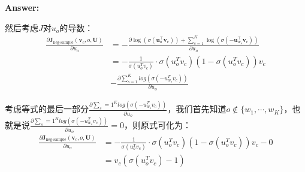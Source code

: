 \documentclass{article}
\newenvironment{answer}{
    {\bf Answer:} \sf \begingroup\color{red}
}{\endgroup}%
\begin{document}
\begin{enumerate}[label=(\alph*)]
\begin{shaded}
\begin{answer}
然后考虑$J$对$u_o$的导数：
\begin{equation}
	\begin{array}{cl}
 \frac{\partial \bm J_{\text{neg-sample}}(\bm v_c, o, \bm U)}{\partial  u_o} &= -\frac{\partial \log(\sigma(\bm u_o^\top \bm v_c)) + \sum_{s=1}^K \log(\sigma(-\bm u_{w_s}^\top \bm v_c)) }{\partial u_o}\\ 	
 &= -\frac{1}{\sigma(u_o^T v_c)} \cdot \sigma(u_o^T v_c) (1- \sigma(u_o^T v_c) ) v_c \\
 & - \frac{\partial \sum_{s=1}^K log(\sigma(-u_{w_s}^T v_c))}{\partial u_o}
 \end{array}
\end{equation}

考虑等式的最后一部分$\frac{\partial \sum_s=1 ^K log(\sigma(-u_{w_s}^T v_c))}{\partial u_o}$，我们首先知道$o \notin \{w_1,\cdots,w_K\}$，也就是说$\frac{\partial \sum_s=1 ^K log(\sigma(-u_{w_s}^T v_c))}{\partial u_o}=0$，则原式可化为：
\begin{equation}
	\begin{array}{cl}
 \frac{\partial \bm J_{\text{neg-sample}}(\bm v_c, o, \bm U)}{\partial  u_{o}} &= -\frac{1}{\sigma(u_o^T v_c)} \cdot \sigma(u_o^T v_c) (1- \sigma(u_o^T v_c) ) v_c - 0\\
 & = v_c(\sigma(u_o^Tv_c)-1)
 \end{array}
\end{equation}


\end{answer}
\end{shaded}
\end{enumerate}
\end{document}
